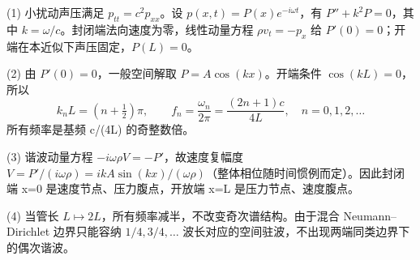 (1) 小扰动声压满足 \(p_{tt}=c^2p_{xx}\)。设 \(p(x,t)=P(x)e^{-i\omega t}\)，有 \(P''+k^2P=0\)，其中 \(k=\omega/c\)。封闭端法向速度为零，线性动量方程 \(\rho v_t=-p_x\) 给 \(P'(0)=0\)；开端在本近似下声压固定，\(P(L)=0\)。

(2) 由 \(P'(0)=0\)，一般空间解取 \(P=A\cos(kx)\)。开端条件 \(\cos(kL)=0\)，所以
\[
k_nL=(n+\tfrac12)\pi,\qquad
f_n=\frac{\omega_n}{2\pi}=\frac{(2n+1)c}{4L},\quad n=0,1,2,\ldots
\]
所有频率是基频 c/(4L) 的奇整数倍。

(3) 谐波动量方程 \(-i\omega\rho V=-P'\)，故速度复幅度 \(V=P'/(i\omega\rho)=ikA\sin(kx)/(\omega\rho)\)（整体相位随时间惯例而定）。因此封闭端 x=0 是速度节点、压力腹点，开放端 x=L 是压力节点、速度腹点。

(4) 当管长 \(L\mapsto2L\)，所有频率减半，不改变奇次谱结构。由于混合 Neumann–Dirichlet 边界只能容纳 \(1/4,3/4,\ldots\) 波长对应的空间驻波，不出现两端同类边界下的偶次谐波。
